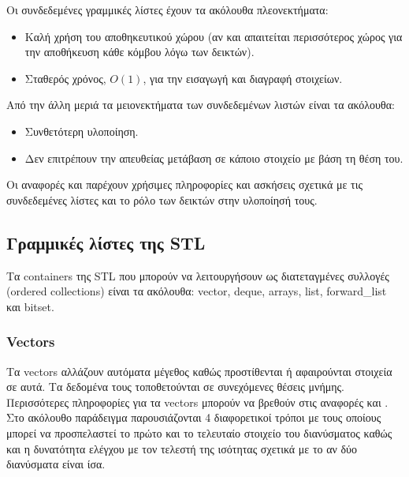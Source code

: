 






\noindent Οι συνδεδεμένες γραμμικές λίστες έχουν τα ακόλουθα πλεονεκτήματα:
\begin{itemize}[nolistsep]
\item Καλή χρήση του αποθηκευτικού χώρου (αν και απαιτείται περισσότερος χώρος για την αποθήκευση κάθε κόμβου λόγω των δεικτών). 
\item Σταθερός χρόνος, $O(1)$, για την εισαγωγή και διαγραφή στοιχείων.
\end{itemize}

\noindent Από την άλλη μεριά τα μειονεκτήματα των συνδεδεμένων λιστών είναι τα ακόλουθα:
\begin{itemize}[nolistsep]
\item Συνθετότερη υλοποίηση.
\item Δεν επιτρέπουν την απευθείας μετάβαση σε κάποιο στοιχείο με βάση τη θέση του.
\end{itemize}

Οι αναφορές \cite{csstanford103} και \cite{csstanford105} παρέχουν χρήσιμες πληροφορίες και ασκήσεις σχετικά με τις συνδεδεμένες λίστες και το ρόλο των δεικτών στην υλοποίησή τους.

\subsection{Γραμμικές λίστες της STL}
Τα containers της STL που μπορούν να λειτουργήσουν ως διατεταγμένες συλλογές (ordered collections) είναι τα ακόλουθα: vector, deque, arrays, list, forward\_list και bitset. 

\subsubsection{Vectors}
Τα vectors αλλάζουν αυτόματα μέγεθος καθώς προστίθενται ή αφαιρούνται στοιχεία σε αυτά. Τα δεδομένα τους τοποθετούνται σε συνεχόμενες θέσεις μνήμης. Περισσότερες πληροφορίες για τα vectors μπορούν να βρεθούν στις αναφορές \cite{g4gvector} και \cite{codecogsvector}. Στο ακόλουθο παράδειγμα παρουσιάζονται 4 διαφορετικοί τρόποι με τους οποίους μπορεί να προσπελαστεί το πρώτο και το τελευταίο στοιχείο του διανύσματος καθώς και η δυνατότητα ελέγχου με τον τελεστή της ισότητας σχετικά με το αν δύο διανύσματα είναι ίσα.

